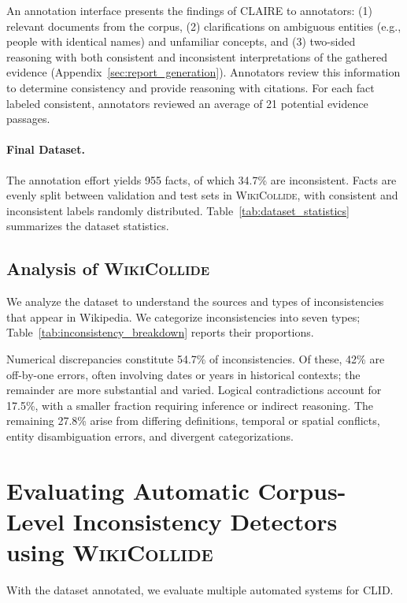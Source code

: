\documentclass[11pt]{article}
\newcommand{\task}[0]{CLID\xspace}
\newcommand{\dataset}[0]{\textsc{WikiCollide}\xspace}
\newcommand{\system}[0]{\textsc{CLAIRE}\xspace}
\begin{document}
An annotation interface presents the findings of \system to annotators: (1) relevant documents from the corpus, (2) clarifications on ambiguous entities (e.g., people with identical names) and unfamiliar concepts, and (3) two-sided reasoning with both consistent and inconsistent interpretations of the gathered evidence (Appendix~\ref{sec:report_generation}). Annotators review this information to determine consistency and provide reasoning with citations. For each fact labeled consistent, annotators reviewed an average of 21 potential evidence passages.

\paragraph{Final Dataset.} The annotation effort yields 955 facts, of which 34.7\% are inconsistent. Facts are evenly split between validation and test sets in \dataset, with consistent and inconsistent labels randomly distributed. Table~\ref{tab:dataset_statistics} summarizes the dataset statistics.

\subsection{Analysis of \dataset}

We analyze the dataset to understand the sources and types of inconsistencies that appear in Wikipedia. We categorize inconsistencies into seven types; Table~\ref{tab:inconsistency_breakdown} reports their proportions.

Numerical discrepancies constitute 54.7\% of inconsistencies. Of these, 42\% are off-by-one errors, often involving dates or years in historical contexts; the remainder are more substantial and varied. Logical contradictions account for 17.5\%, with a smaller fraction requiring inference or indirect reasoning. The remaining 27.8\% arise from differing definitions, temporal or spatial conflicts, entity disambiguation errors, and divergent categorizations.


















\section{Evaluating Automatic Corpus-Level Inconsistency Detectors using \dataset}
\label{sec:experiment}
With the dataset annotated, we evaluate multiple automated systems for \task.
\end{document}
